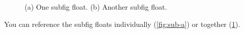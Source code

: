 \begin{figure}
  \begin{center}
    \caption{(a) One subfig float. (b) Another subfig float.%
      \label{fig:both}}
  \end{center}
\end{figure}
You can reference the subfig floats individually (\ref{fig:sub-a}) or
together (\ref{fig:both}).


\endinput
